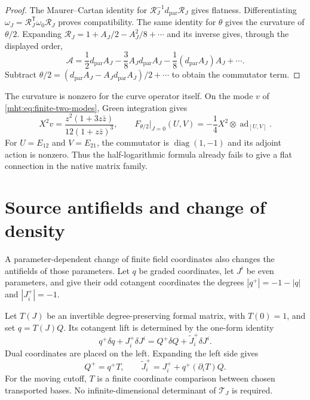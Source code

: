 \begin{proof}
The Maurer--Cartan identity for $\mathcal R_J^{-1}d_{\mathrm{par}}\mathcal R_J$
gives flatness. Differentiating
$\omega_J=\mathcal R_J^{\mathsf T}\omega_0\mathcal R_J$ proves
compatibility. The same identity for $\theta$ gives the curvature
of $\theta/2$. Expanding $\mathcal R_J=1+A_J/2-A_J^2/8+\cdots$
and its inverse gives, through the displayed order,
\[
 \mathcal A=\frac12d_{\mathrm{par}}A_J
       -\frac38A_Jd_{\mathrm{par}}A_J
       -\frac18(d_{\mathrm{par}}A_J)A_J+\cdots.
\]
Subtract $\theta/2=(d_{\mathrm{par}}A_J-A_Jd_{\mathrm{par}}A_J)/2+\cdots$
to obtain the commutator term.
\end{proof}

The curvature is nonzero for the curve operator itself. On the
mode $v$ of \eqref{mht:eq:finite-two-modes}, Green integration gives
\begin{equation}\label{mht:eq:native-frame-curvature}
 X^2v=\frac{z^2(1+3z\bar z)}{12(1+z\bar z)^3},\qquad
 F_{\theta/2}|_{J=0}(U,V)
       =-\frac14X^2\otimes\operatorname{ad}_{[U,V]}.
\end{equation}
For $U=E_{12}$ and $V=E_{21}$, the commutator is
$\operatorname{diag}(1,-1)$ and its adjoint action is nonzero.
Thus the half-logarithmic formula already fails to give a flat
connection in the native matrix family.

\section{Source antifields and change of density}

A parameter-dependent change of finite field coordinates also
changes the antifields of those parameters. Let $q$ be graded
coordinates, let $J^i$ be even parameters, and give their odd
cotangent coordinates the degrees
$|q^+|=-1-|q|$ and $|J_i^+|=-1$.

Let $T(J)$ be an invertible degree-preserving formal matrix,
with $T(0)=1$, and set $q=T(J)Q$. Its cotangent lift is determined
by the one-form identity
\begin{equation}\label{mht:eq:moving-source-cotangent}
 q^+\delta q+J_i^+\delta J^i
       =Q^+\delta Q+\widetilde J_i^+\delta J^i.
\end{equation}
Dual coordinates are placed on the left. Expanding the left side gives
\begin{equation}\label{mht:eq:moving-antifield-shift}
 Q^+=q^+T,\qquad
 \widetilde J_i^+=J_i^++q^+(\partial_iT)Q.
\end{equation}
For the moving cutoff, $T$ is a finite coordinate comparison between
chosen transported bases. No infinite-dimensional determinant of
$\mathcal T_J$ is required.

